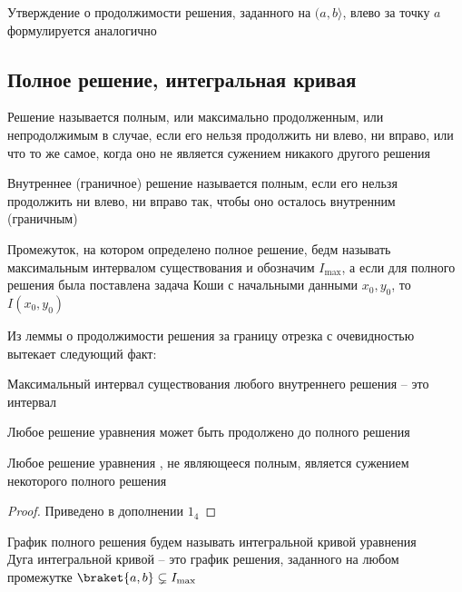 Утверждение о продолжимости решения, заданного на $ (a, b \rangle $, влево за точку $ a $ формулируется аналогично

\subsection{Полное решение, интегральная кривая}

\begin{definition}
	Решение называется полным, или максимально продолженным, или непродолжимым в случае, если его нельзя продолжить ни влево, ни вправо, или что то же самое, когда оно не является сужением никакого другого решения
\end{definition}

\begin{definition}
	Внутреннее (граничное) решение называется полным, если его нельзя продолжить ни влево, ни вправо так, чтобы оно осталось внутренним (граничным)
\end{definition}

\begin{definition}
    Промежуток, на котором определено полное решение, бедм называть максимальным интервалом существования и обозначим $ I_{\max} $, а если для полного решения была поставлена задача Коши с начальными данными $ x_0, y_0 $, то $ I(x_0, y_0) $
\end{definition}

Из леммы о продолжимости решения за границу отрезка с очевидностью вытекает следующий факт:
\begin{statement}
	Максимальный интервал существования любого внутреннего решения -- это интервал
\end{statement}

\begin{theorem}
    Любое решение уравнения  может быть продолжено до полного решения
\end{theorem}

\begin{restate}
    Любое решение уравнения , не являющееся полным, является сужением некоторого полного решения
\end{restate}

\begin{proof}
	Приведено в дополнении $ 1_4 $
\end{proof}

\begin{definition}
    График полного решения будем называть интегральной кривой уравнения  \\
    Дуга интегральной кривой -- это график решения, заданного на любом промежутке $ \braket{a, b} \subsetneq I_{\max} $
\end{definition}

